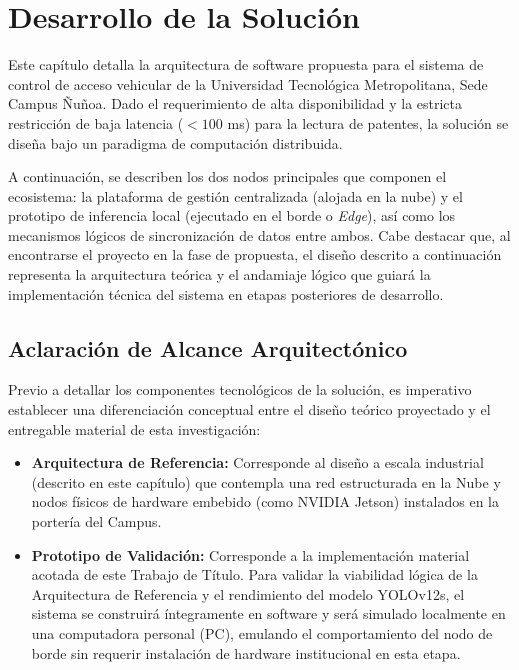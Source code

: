 
\chapter{Desarrollo de la Solución}

Este capítulo detalla la arquitectura de software propuesta para el sistema de control de acceso vehicular de la Universidad Tecnológica Metropolitana, Sede Campus Ñuñoa. Dado el requerimiento de alta disponibilidad y la estricta restricción de baja latencia ($<100$ ms) para la lectura de patentes, la solución se diseña bajo un paradigma de computación distribuida. 

A continuación, se describen los dos nodos principales que componen el ecosistema: la plataforma de gestión centralizada (alojada en la nube) y el prototipo de inferencia local (ejecutado en el borde o \textit{Edge}), así como los mecanismos lógicos de sincronización de datos entre ambos. Cabe destacar que, al encontrarse el proyecto en la fase de propuesta, el diseño descrito a continuación representa la arquitectura teórica y el andamiaje lógico que guiará la implementación técnica del sistema en etapas posteriores de desarrollo.

\section{Aclaración de Alcance Arquitectónico}

Previo a detallar los componentes tecnológicos de la solución, es imperativo establecer una diferenciación conceptual entre el diseño teórico proyectado y el entregable material de esta investigación:
\begin{itemize}
    \item \textbf{Arquitectura de Referencia:} Corresponde al diseño a escala industrial (descrito en este capítulo) que contempla una red estructurada en la Nube y nodos físicos de hardware embebido (como NVIDIA Jetson) instalados en la portería del Campus.
    \item \textbf{Prototipo de Validación:} Corresponde a la implementación material acotada de este Trabajo de Título. Para validar la viabilidad lógica de la Arquitectura de Referencia y el rendimiento del modelo YOLOv12s, el sistema se construirá íntegramente en software y será simulado localmente en una computadora personal (PC), emulando el comportamiento del nodo de borde sin requerir instalación de hardware institucional en esta etapa.
\end{itemize}

